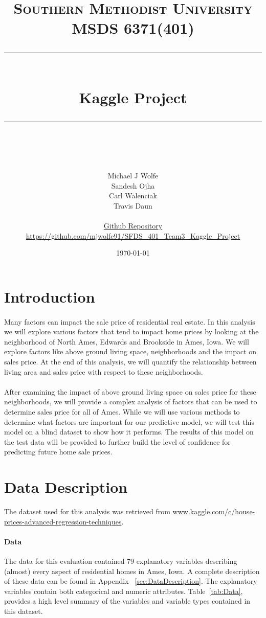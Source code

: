 \documentclass[11pt]{scrartcl} %
\title{	
	\normalfont\normalsize
	\textsc{Southern Methodist University\\
	 MSDS 6371(401)}\\ %
	\vspace{25pt} %
	\rule{\linewidth}{0.5pt}\\ %
	\vspace{20pt} %
	{\huge Kaggle Project}\\ %
	\vspace{12pt} %
	\rule{\linewidth}{2pt}\\ %
	\vspace{12pt} %
}
\author{\LARGE Michael J Wolfe\\
			\LARGE Sandesh Ojha\\
			\LARGE Carl Walenciak\\
			\LARGE Travis Daun\\
			\\
			\small \href{https://github.com/mjwolfe91/SFDS_401_Team3_Kaggle_Project}{Github Repository}\\
			\small \href{https://github.com/mjwolfe91/SFDS_401_Team3_Kaggle_Project}{https://github.com/mjwolfe91/SFDS\_401\_Team3\_Kaggle\_Project}\\} %
\date{\normalsize\today} %
\begin{document}
\maketitle %


\pagebreak


\tableofcontents{}
\pagebreak


\section{Introduction}
\paragraph{} Many factors can impact the sale price of residential real estate.  In this analysis we will explore various factors that tend to impact home prices by looking at the neighborhood of North Ames, Edwards and Brookside in Ames, Iowa.  We will explore factors like above ground living space, neighborhoods and the impact on sales price.  At the end of this analysis, we will quantify the relationship between living area and sales price with respect to these neighborhoods.

\paragraph{} After examining the impact of above ground living space on sales price for these neighborhoods, we will provide a complex analysis of factors that can be used to determine sales price for all of Ames.  While we will use various methods to determine what factors are important for our predictive model, we will test this model on a blind dataset to show how it performs. The results of this model on the test data will be provided to further build the level of confidence for predicting future home sale prices.

\section{Data Description}
The dataset used for this analysis was retrieved from \href{https://www.kaggle.com/c/house-prices-advanced-regression-techniques}{www.kaggle.com/c/house-prices-advanced-regression-techniques}.
\paragraph{Data} The data for this evaluation contained 79 explanatory variables describing (almost) every aspect of residential homes in Ames, Iowa. A complete description of these data can be found in Appendix ~\ref{sec:DataDescription}. The explanatory variables contain both categorical and numeric attributes.  Table~\ref{tab:Data}, provides a high level summary of the variables and variable types contained in this dataset.
\end{document}
